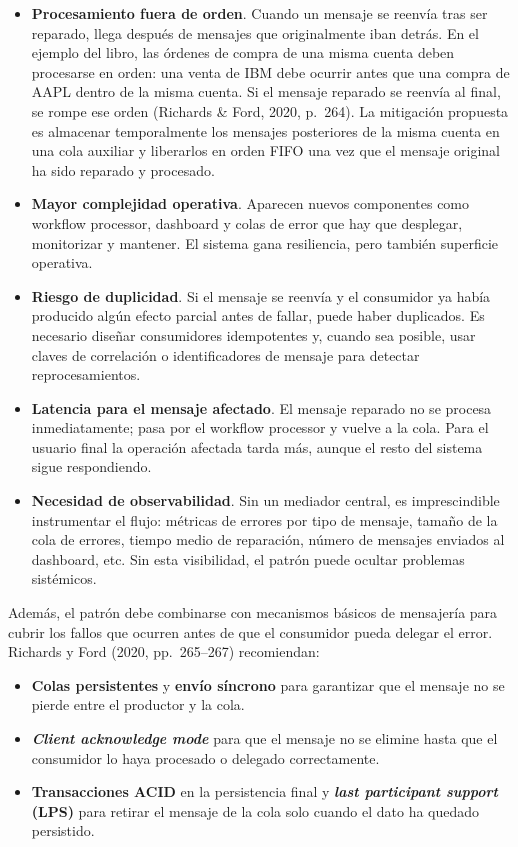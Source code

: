 \documentclass[12pt,a4paper]{article}
\begin{document}
\begin{itemize}[label=$\cdot$]
  \item \textbf{Procesamiento fuera de orden}. Cuando un mensaje se reenvía tras ser reparado, llega después de mensajes que originalmente iban detrás. En el ejemplo del libro, las órdenes de compra de una misma cuenta deben procesarse en orden: una venta de IBM debe ocurrir antes que una compra de AAPL dentro de la misma cuenta. Si el mensaje reparado se reenvía al final, se rompe ese orden (Richards \& Ford, 2020, p.~264). La mitigación propuesta es almacenar temporalmente los mensajes posteriores de la misma cuenta en una cola auxiliar y liberarlos en orden FIFO una vez que el mensaje original ha sido reparado y procesado.
  \item \textbf{Mayor complejidad operativa}. Aparecen nuevos componentes como workflow processor, dashboard y colas de error que hay que desplegar, monitorizar y mantener. El sistema gana resiliencia, pero también superficie operativa.
  \item \textbf{Riesgo de duplicidad}. Si el mensaje se reenvía y el consumidor ya había producido algún efecto parcial antes de fallar, puede haber duplicados. Es necesario diseñar consumidores idempotentes y, cuando sea posible, usar claves de correlación o identificadores de mensaje para detectar reprocesamientos.
  \item \textbf{Latencia para el mensaje afectado}. El mensaje reparado no se procesa inmediatamente; pasa por el workflow processor y vuelve a la cola. Para el usuario final la operación afectada tarda más, aunque el resto del sistema sigue respondiendo.
  \item \textbf{Necesidad de observabilidad}. Sin un mediador central, es imprescindible instrumentar el flujo: métricas de errores por tipo de mensaje, tamaño de la cola de errores, tiempo medio de reparación, número de mensajes enviados al dashboard, etc. Sin esta visibilidad, el patrón puede ocultar problemas sistémicos.
\end{itemize}

Además, el patrón debe combinarse con mecanismos básicos de mensajería para cubrir los fallos que ocurren antes de que el consumidor pueda delegar el error. Richards y Ford (2020, pp.~265--267) recomiendan:

\begin{itemize}[label=$\cdot$]
  \item \textbf{Colas persistentes} y \textbf{envío síncrono} para garantizar que el mensaje no se pierde entre el productor y la cola.
  \item \textbf{\emph{Client acknowledge mode}} para que el mensaje no se elimine hasta que el consumidor lo haya procesado o delegado correctamente.
  \item \textbf{Transacciones ACID} en la persistencia final y \textbf{\emph{last participant support} (LPS)} para retirar el mensaje de la cola solo cuando el dato ha quedado persistido.
\end{itemize}
\end{document}
